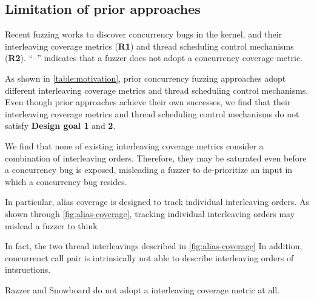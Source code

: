 %


\subsection{Limitation of prior approaches}
\label{ss:existingapproaches}

\begin{table}[t]
  \centering
  
  \caption{Recent fuzzing works to discover concurrency bugs in the
    kernel, and their interleaving coverage metrics (\textbf{R1}) and
    thread scheduling control mechanisms (\textbf{R2}). ``--''
    indicates that a fuzzer does not adopt a concurrency coverage
    metric.}
  \label{table:motivation}
\end{table}

As shown in \autoref{table:motivation}, prior concurrency fuzzing
approaches adopt different interleaving coverage metrics and thread
scheduling control mechanisms.
%
Even though prior approaches achieve their own successes, we find that
their interleaving coverage metrics and thread scheduling control
mechanisms do not satisfy \textbf{Design goal 1} and \textbf{2}.


%
We find that none of existing interleaving coverage metrics consider
a combination of interleaving orders.
%
Therefore, they may be saturated even before a concurrency bug is
exposed, misleading a fuzzer to de-prioritize an input in which a
concurrency bug resides.


In particular, alias coverage is designed to track individual
interleaving orders. As shown through \autoref{fig:alias-coverage},
tracking individual interleaving orders may mislead a fuzzer to think

%
In fact, the two thread interleavings described in
\autoref{fig:alias-coverage}
%
In addition, concurrenct call pair is intrinsically not able to
describe interleaving orders of intsructions.

Razzer and Snowboard do not adopt a interleaving coverage metric at
all.



